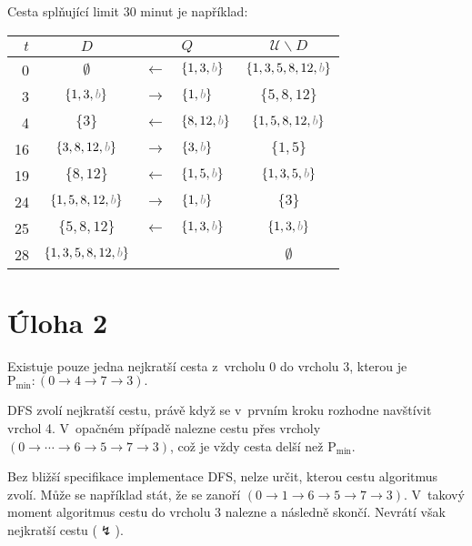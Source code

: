 \documentclass{article}
\newcommand{\U}{\mathcal{U}}
\newcommand{\myb}{{\color{gray} b}}
\newcommand{\Pmin}{\text{P}_\text{min}}
\begin{document}
    Cesta splňující limit 30 minut je například:
    \begin{center}
    { \renewcommand{\arraystretch}{1.2}
        \begin{tabular}
        { r !{\color{lightgray}\vrule} c !{\color{lightgray}\vrule} r l !{\color{lightgray}\vrule} c }
            $t$ & $D$                        &               & $Q$               & $\U \smallsetminus D$      \\
               & $\emptyset$                & $\leftarrow$  & $\{1,3, \myb\}$   & $\{1, 3, 5, 8, 12, \myb\}$ \\[2mm]
            3   & $\{1, 3, \myb\}$           & $\rightarrow$ & $\{1, \myb\}$     & $\{5, 8, 12\}$             \\[2mm]
            4   & $\{3\}$                    & $\leftarrow$  & $\{8, 12, \myb\}$ & $\{1, 5, 8, 12, \myb\}$    \\[2mm]
            16  & $\{3, 8, 12, \myb\}$       & $\rightarrow$ & $\{3, \myb\}$     & $\{1, 5\}$                 \\[2mm]
            19  & $\{8, 12\}$                & $\leftarrow$  & $\{1, 5, \myb\}$  & $\{1, 3, 5, \myb\}$        \\[2mm]
            24  & $\{1, 5, 8, 12, \myb\}$    & $\rightarrow$ & $\{1, \myb\}$     & $\{3\}$                    \\[2mm]
            25  & $\{5, 8, 12\}$             & $\leftarrow$  & $\{1,3, \myb\}$   & $\{1, 3, \myb\}$           \\[2mm]
            28  & $\{1, 3, 5, 8, 12, \myb\}$ &               &                   & $\emptyset$                \\[2mm]
        \end{tabular}}
    \end{center}

    \section*{Úloha 2}

    Existuje pouze jedna nejkratší cesta z~vrcholu 0 do vrcholu 3, kterou je
    \(
    \Pmin: (0 \rightarrow 4 \rightarrow 7 \rightarrow 3).
    \)

    DFS zvolí nejkratší cestu, právě když se v~prvním kroku rozhodne navštívit vrchol 4.
    V~opačném případě nalezne cestu přes vrcholy $(0 \rightarrow \cdots \rightarrow 6 \rightarrow 5 \rightarrow 7 \rightarrow 3)$,
    což je vždy cesta delší než $\Pmin$.

    Bez bližší specifikace implementace DFS, nelze určit, kterou cestu algoritmus zvolí. Může se například stát, že se zanoří $(0 \rightarrow 1 \rightarrow 6 \rightarrow 5 \rightarrow 7 \rightarrow 3)$. V~takový moment algoritmus cestu do vrcholu 3 nalezne a následně skončí. Nevrátí však nejkratší cestu ($\lightning$).
\end{document}
